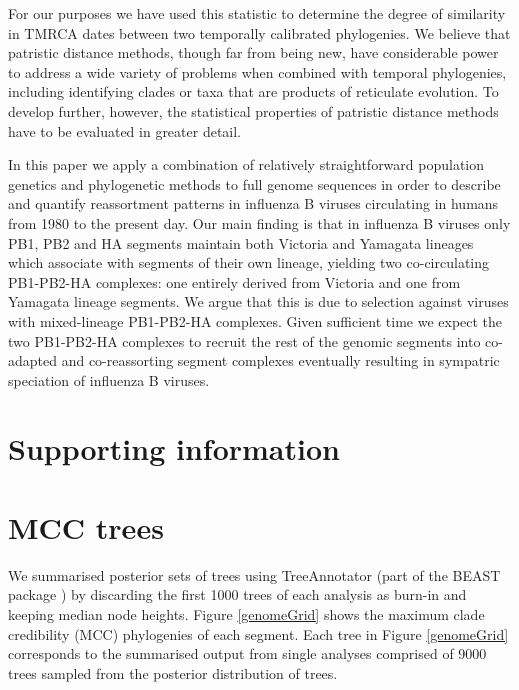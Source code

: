 \documentclass[11pt,oneside,letterpaper]{article}
\begin{document}
For our purposes we have used this statistic to determine the degree of similarity in TMRCA dates between two temporally calibrated phylogenies.
We believe that patristic distance methods, though far from being new, have considerable power to address a wide variety of problems when combined with temporal phylogenies, including identifying clades or taxa that are products of reticulate evolution.
To develop further, however, the statistical properties of patristic distance methods have to be evaluated in greater detail.

In this paper we apply a combination of relatively straightforward population genetics and phylogenetic methods to full genome sequences in order to describe and quantify reassortment patterns in influenza B viruses circulating in humans from 1980 to the present day.
Our main finding is that in influenza B viruses only PB1, PB2 and HA segments maintain both Victoria and Yamagata lineages which associate with segments of their own lineage, yielding two co-circulating PB1-PB2-HA complexes: one entirely derived from Victoria and one from Yamagata lineage segments.
We argue that this is due to selection against viruses with mixed-lineage PB1-PB2-HA complexes.
Given sufficient time we expect the two PB1-PB2-HA complexes to recruit the rest of the genomic segments into co-adapted and co-reassorting segment complexes eventually resulting in sympatric speciation of influenza B viruses.

\newpage

\section*{Supporting information}
\setcounter{figure}{0}
\setcounter{table}{0}
\renewcommand{\thefigure}{S\arabic{figure}}
\renewcommand{\thetable}{S\arabic{table}}


\section*{MCC trees}

We summarised posterior sets of trees using TreeAnnotator (part of the BEAST package \cite{drummond2012}) by discarding the first 1000 trees of each analysis as burn-in and keeping median node heights.
Figure \ref{genomeGrid} shows the maximum clade credibility (MCC) phylogenies of each segment.
Each tree in Figure \ref{genomeGrid} corresponds to the summarised output from single analyses comprised of 9000 trees sampled from the posterior distribution of trees.
\end{document}
